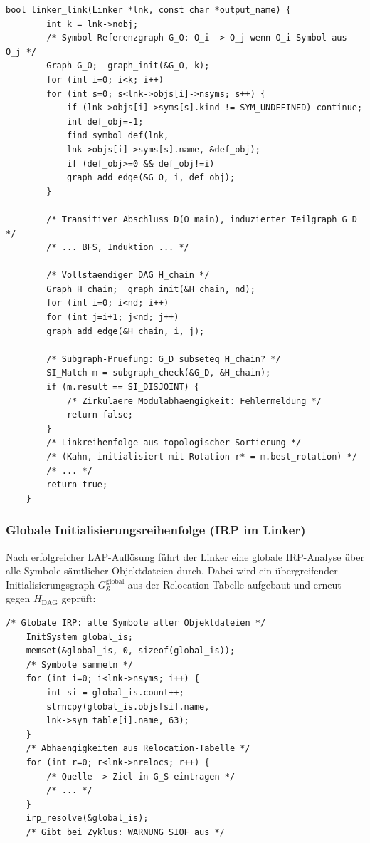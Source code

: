 ﻿\documentclass[a4paper,12pt]{article}
\theoremstyle{definition}
\begin{document}
\begin{lstlisting}[style=cstyle, caption={LAP -- G\_O aufbauen und
		SI-Prüfung (linker.c)}, label=lst:lap-impl]
	bool linker_link(Linker *lnk, const char *output_name) {
		int k = lnk->nobj;
		/* Symbol-Referenzgraph G_O: O_i -> O_j wenn O_i Symbol aus O_j */
		Graph G_O;  graph_init(&G_O, k);
		for (int i=0; i<k; i++)
		for (int s=0; s<lnk->objs[i]->nsyms; s++) {
			if (lnk->objs[i]->syms[s].kind != SYM_UNDEFINED) continue;
			int def_obj=-1;
			find_symbol_def(lnk,
			lnk->objs[i]->syms[s].name, &def_obj);
			if (def_obj>=0 && def_obj!=i)
			graph_add_edge(&G_O, i, def_obj);
		}
		
		/* Transitiver Abschluss D(O_main), induzierter Teilgraph G_D */
		/* ... BFS, Induktion ... */
		
		/* Vollstaendiger DAG H_chain */
		Graph H_chain;  graph_init(&H_chain, nd);
		for (int i=0; i<nd; i++)
		for (int j=i+1; j<nd; j++)
		graph_add_edge(&H_chain, i, j);
		
		/* Subgraph-Pruefung: G_D subseteq H_chain? */
		SI_Match m = subgraph_check(&G_D, &H_chain);
		if (m.result == SI_DISJOINT) {
			/* Zirkulaere Modulabhaengigkeit: Fehlermeldung */
			return false;
		}
		/* Linkreihenfolge aus topologischer Sortierung */
		/* (Kahn, initialisiert mit Rotation r* = m.best_rotation) */
		/* ... */
		return true;
	}
\end{lstlisting}

\subsubsection{Globale Initialisierungsreihenfolge (IRP im Linker)}

Nach erfolgreicher LAP-Auflösung führt der Linker eine globale
IRP-Analyse über alle Symbole sämtlicher Objektdateien durch. Dabei wird
ein übergreifender Initialisierungsgraph $G_{\mathcal{S}}^{\text{global}}$
aus der Relocation-Tabelle aufgebaut und erneut gegen $H_{\text{DAG}}$
geprüft:

\begin{lstlisting}[style=cstyle, caption={Globale IRP im Linker (linker.c)},
	label=lst:irp-linker]
	/* Globale IRP: alle Symbole aller Objektdateien */
	InitSystem global_is;
	memset(&global_is, 0, sizeof(global_is));
	/* Symbole sammeln */
	for (int i=0; i<lnk->nsyms; i++) {
		int si = global_is.count++;
		strncpy(global_is.objs[si].name,
		lnk->sym_table[i].name, 63);
	}
	/* Abhaengigkeiten aus Relocation-Tabelle */
	for (int r=0; r<lnk->nrelocs; r++) {
		/* Quelle -> Ziel in G_S eintragen */
		/* ... */
	}
	irp_resolve(&global_is);
	/* Gibt bei Zyklus: WARNUNG SIOF aus */
\end{lstlisting}
\end{document}
